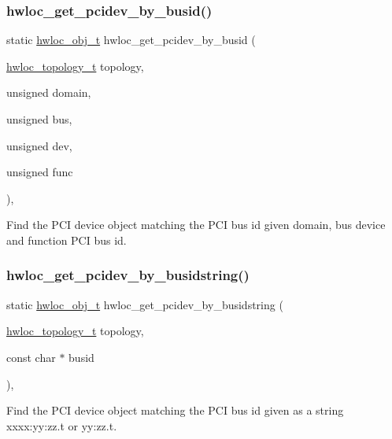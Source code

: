 \subsubsection{\texorpdfstring{hwloc\+\_\+get\+\_\+pcidev\+\_\+by\+\_\+busid()}{hwloc\_get\_pcidev\_by\_busid()}}
{\footnotesize\ttfamily static \hyperlink{a00185_ga79b8ab56877ef99ac59b833203391c7d}{hwloc\+\_\+obj\+\_\+t} hwloc\+\_\+get\+\_\+pcidev\+\_\+by\+\_\+busid (\begin{DoxyParamCaption}\item[{\hyperlink{a00186_ga9d1e76ee15a7dee158b786c30b6a6e38}{hwloc\+\_\+topology\+\_\+t}}]{topology,  }\item[{unsigned}]{domain,  }\item[{unsigned}]{bus,  }\item[{unsigned}]{dev,  }\item[{unsigned}]{func }\end{DoxyParamCaption})\hspace{0.3cm}{\ttfamily [inline]}, {\ttfamily [static]}}



Find the P\+CI device object matching the P\+CI bus id given domain, bus device and function P\+CI bus id. 

\mbox{\label{a00204_ga23a978469353134b3104b846fe2efceb}} 
\subsubsection{\texorpdfstring{hwloc\+\_\+get\+\_\+pcidev\+\_\+by\+\_\+busidstring()}{hwloc\_get\_pcidev\_by\_busidstring()}}
{\footnotesize\ttfamily static \hyperlink{a00185_ga79b8ab56877ef99ac59b833203391c7d}{hwloc\+\_\+obj\+\_\+t} hwloc\+\_\+get\+\_\+pcidev\+\_\+by\+\_\+busidstring (\begin{DoxyParamCaption}\item[{\hyperlink{a00186_ga9d1e76ee15a7dee158b786c30b6a6e38}{hwloc\+\_\+topology\+\_\+t}}]{topology,  }\item[{const char $\ast$}]{busid }\end{DoxyParamCaption})\hspace{0.3cm}{\ttfamily [inline]}, {\ttfamily [static]}}



Find the P\+CI device object matching the P\+CI bus id given as a string xxxx\+:yy\+:zz.\+t or yy\+:zz.\+t. 


